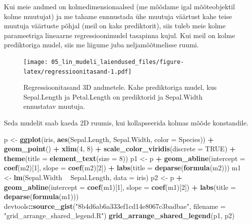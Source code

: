 \documentclass[]{book}
\newenvironment{Shaded}{\begin{snugshade}}{\end{snugshade}}
\newcommand{\KeywordTok}[1]{\textcolor[rgb]{0.13,0.29,0.53}{\textbf{#1}}}
\newcommand{\DataTypeTok}[1]{\textcolor[rgb]{0.13,0.29,0.53}{#1}}
\newcommand{\DecValTok}[1]{\textcolor[rgb]{0.00,0.00,0.81}{#1}}
\newcommand{\StringTok}[1]{\textcolor[rgb]{0.31,0.60,0.02}{#1}}
\newcommand{\OtherTok}[1]{\textcolor[rgb]{0.56,0.35,0.01}{#1}}
\newcommand{\OperatorTok}[1]{\textcolor[rgb]{0.81,0.36,0.00}{\textbf{#1}}}
\newcommand{\NormalTok}[1]{#1}
\begin{document}
Kui meie andmed on kolmedimensionaalsed (me mõõdame igal mõõteobjektil
kolme muutujat) ja me tahame ennnustada ühe muutuja väärtust kahe teise
muutuja väärtuste põhjal (meil on kaks prediktorit), siis tuleb meie
kolme parameetriga lineaarne regressioonimudel tasapinna kujul. Kui meil
on kolme prediktoriga mudel, siis me liigume juba neljamõõtmelisse
ruumi.





\begin{figure}
\centering
\texttt{[image: 05\_lin\_mudeli\_laiendused\_files/figure-latex/regressioonitasand-1.pdf]}
\caption{\label{fig:regressioonitasand}Regressioonitasand 3D andmetele. Kahe
prediktoriga mudel, kus Sepal.Length ja Petal.Length on prediktorid ja
Sepal.Width ennustatav muutuja.}
\end{figure}

Seda mudelit saab kaeda 2D ruumis, kui kollapseerida kolmas mõõde
konstandile.






\begin{Shaded}
\begin{Highlighting}[]
\NormalTok{p <-}\StringTok{ }\KeywordTok{ggplot}\NormalTok{(iris, }\KeywordTok{aes}\NormalTok{(Sepal.Length, Sepal.Width, }\DataTypeTok{color =}\NormalTok{ Species)) }\OperatorTok{+}
\StringTok{  }\KeywordTok{geom_point}\NormalTok{() }\OperatorTok{+}
\StringTok{  }\KeywordTok{xlim}\NormalTok{(}\DecValTok{4}\NormalTok{, }\DecValTok{8}\NormalTok{) }\OperatorTok{+}
\StringTok{  }\KeywordTok{scale_color_viridis}\NormalTok{(}\DataTypeTok{discrete =} \OtherTok{TRUE}\NormalTok{) }\OperatorTok{+}
\StringTok{  }\KeywordTok{theme}\NormalTok{(}\DataTypeTok{title =} \KeywordTok{element_text}\NormalTok{(}\DataTypeTok{size =} \DecValTok{8}\NormalTok{))}
\NormalTok{p1 <-}\StringTok{ }\NormalTok{p }\OperatorTok{+}\StringTok{ }\KeywordTok{geom_abline}\NormalTok{(}\DataTypeTok{intercept =} \KeywordTok{coef}\NormalTok{(m2)[}\DecValTok{1}\NormalTok{], }\DataTypeTok{slope =} \KeywordTok{coef}\NormalTok{(m2)[}\DecValTok{2}\NormalTok{]) }\OperatorTok{+}
\StringTok{  }\KeywordTok{labs}\NormalTok{(}\DataTypeTok{title =} \KeywordTok{deparse}\NormalTok{(}\KeywordTok{formula}\NormalTok{(m2)))}
\NormalTok{m1 <-}\StringTok{ }\KeywordTok{lm}\NormalTok{(Sepal.Width }\OperatorTok{~}\StringTok{ }\NormalTok{Sepal.Length, }\DataTypeTok{data =}\NormalTok{ iris)}
\NormalTok{p2 <-}\StringTok{ }\NormalTok{p }\OperatorTok{+}\StringTok{ }\KeywordTok{geom_abline}\NormalTok{(}\DataTypeTok{intercept =} \KeywordTok{coef}\NormalTok{(m1)[}\DecValTok{1}\NormalTok{], }\DataTypeTok{slope =} \KeywordTok{coef}\NormalTok{(m1)[}\DecValTok{2}\NormalTok{]) }\OperatorTok{+}
\StringTok{  }\KeywordTok{labs}\NormalTok{(}\DataTypeTok{title =} \KeywordTok{deparse}\NormalTok{(}\KeywordTok{formula}\NormalTok{(m1)))}
\NormalTok{devtools}\OperatorTok{::}\KeywordTok{source_gist}\NormalTok{(}\StringTok{"8b4d6ab6a333ef1cd14e8067c3badbae"}\NormalTok{, }\DataTypeTok{filename =} \StringTok{"grid_arrange_shared_legend.R"}\NormalTok{)}
\KeywordTok{grid_arrange_shared_legend}\NormalTok{(p1, p2)}
\end{Highlighting}
\end{Shaded}
\end{document}
